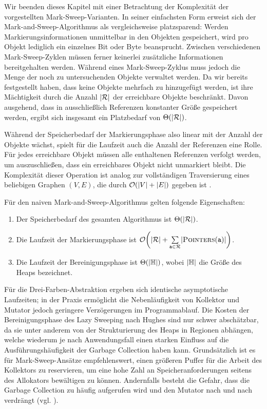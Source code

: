 Wir beenden dieses Kapitel mit einer Betrachtung der Komplexität der vorgestellten Mark-Sweep-Varianten.
In seiner einfachsten Form erweist sich der Mark-and-Sweep-Algorithmus als vergleichsweise platzsparend:
Werden Markierungsinformationen unmittelbar in den Objekten gespeichert, wird pro Objekt lediglich ein einzelnes Bit oder Byte beansprucht.
Zwischen verschiedenen Mark-Sweep-Zyklen müssen ferner keinerlei zusätzliche Informationen bereitgehalten werden.
Während eines Mark-Sweep-Zyklus muss jedoch die Menge  der noch zu untersuchenden Objekte verwaltet werden.
Da wir bereits festgestellt haben, dass keine Objekte mehrfach zu  hinzugefügt werden, ist ihre Mächtigkeit durch die Anzahl $|\mathcal{R}|$ der erreichbare Objekte beschränkt.
Davon ausgehend, dass in  ausschließlich Referenzen konstanter Größe gespeichert werden, ergibt sich insgesamt ein Platzbedarf von $\Theta(|\mathcal{R}|)$.

Während der Speicherbedarf der Markierungsphase also linear mit der Anzahl der Objekte wächst, spielt für die Laufzeit auch die Anzahl der Referenzen eine Rolle.
Für jedes erreichbare Objekt müssen alle enthaltenen Referenzen verfolgt werden, um auszuschließen, dass ein erreichbares Objekt nicht unmarkiert bleibt.
Die Komplexität dieser Operation ist analog zur vollständigen Traversierung eines beliebigen Graphen $(V,E)$, die durch $\mathcal{O}(|V|+|E|)$ gegeben ist \cite[Kap. 22]{cormen-leiserson}.

\begin{mybox}
\begin{satz}
	Für den naiven Mark-and-Sweep-Algorithmus gelten folgende Eigenschaften:
	\begin{enumerate}[(1)]
		\item Der Speicherbedarf des gesamten Algorithmus ist $\Theta(|\mathcal{R}|)$.
		\item Die Laufzeit der Markierungsphase ist $\oh\enb{|\Reach|+\sum\limits_{\Var{a} \in \Reach}^{} \abs{\Pointers(\Var{a})}}$.
		\item Die Laufzeit der Bereinigungsphase ist $\Theta(|\mathbb{H}|)$, wobei $|\mathbb{H}|$ die Größe des Heaps bezeichnet.
	\end{enumerate}
\end{satz}
\end{mybox}

Für die Drei-Farben-Abstraktion ergeben sich identische asymptotische Laufzeiten; in der Praxis ermöglicht die Nebenläufigkeit von Kollektor und Mutator jedoch geringere Verzögerungen im Programmablauf.
Die Kosten der Bereinigungsphase des Lazy Sweeping nach Hughes sind nur schwer abschätzbar, da sie unter anderem von der Strukturierung des Heaps in Regionen abhängen, welche wiederum je nach Anwendungsfall einen starken Einfluss auf die Ausführungshäufigkeit der Garbage Collection haben kann.
Grundsätzlich ist es für Mark-Sweep-Ansätze empfehlenswert, einen größeren Puffer für die Arbeit des Kollektors zu reservieren, um eine hohe Zahl an Speicheranforderungen seitens des Allokators bewältigen zu können.
Andernfalls besteht die Gefahr, dass die Garbage Collection zu häufig aufgerufen wird und den Mutator nach und nach verdrängt (vgl. \cite[S. 70]{jones-lins}).